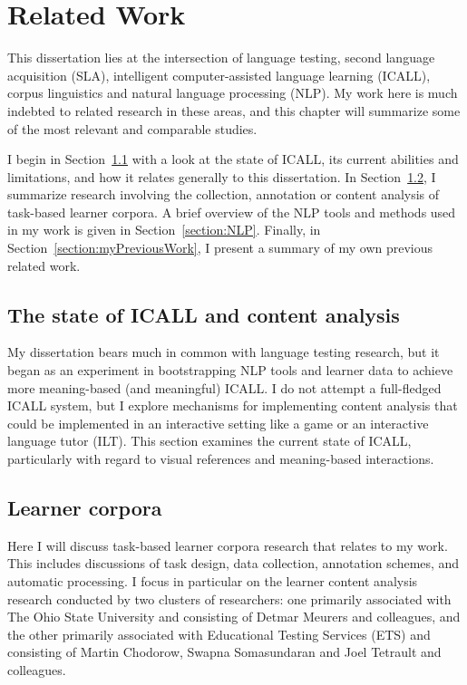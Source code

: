 \chapter{Related Work}
\label{chapter:relatedWork}

This dissertation lies at the intersection of language testing, second language acquisition (SLA), intelligent computer-assisted language learning (ICALL), corpus linguistics and natural language processing (NLP). My work here is much indebted to related research in these areas, and this chapter will summarize some of the most relevant and comparable studies.

I begin in Section~\ref{section:stateOfICALL} with a look at the state of ICALL, its current abilities and limitations, and how it relates generally to this dissertation. In Section~\ref{section:learnerCorpora}, I summarize research involving the collection, annotation or content analysis of task-based learner corpora. A brief overview of the NLP tools and methods used in my work is given in Section~\ref{section:NLP}. Finally, in Section~\ref{section:myPreviousWork}, I present a summary of my own previous related work.

%

\section{The state of ICALL and content analysis}
\label{section:stateOfICALL}
My dissertation bears much in common with language testing research, but it began as an experiment in bootstrapping NLP tools and learner data to achieve more meaning-based (and meaningful) ICALL. I do not attempt a full-fledged ICALL system, but I explore mechanisms for implementing content analysis that could be implemented in an interactive setting like a game or an interactive language tutor (ILT). This section examines the current state of ICALL, particularly with regard to visual references and meaning-based interactions.

\section{Learner corpora}
\label{section:learnerCorpora}
Here I will discuss task-based learner corpora research that relates to my work. This includes discussions of task design, data collection, annotation schemes, and automatic processing. I focus in particular on the learner content analysis research conducted by two clusters of researchers: one primarily associated with The Ohio State University and consisting of Detmar Meurers and colleagues, and the other primarily associated with Educational Testing Services (ETS) and consisting of Martin Chodorow, Swapna Somasundaran and Joel Tetrault and colleagues. 

